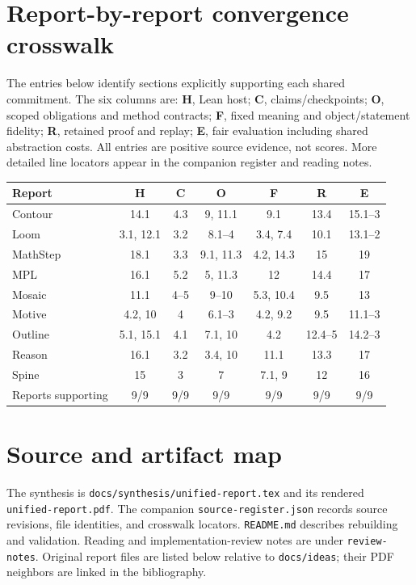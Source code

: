 \documentclass[11pt,letterpaper]{article}
\newcommand{\code}[1]{\nolinkurl{#1}}
\begin{document}
\appendix
\section{Report-by-report convergence crosswalk}\label{app:convergence}
The entries below identify sections explicitly supporting each shared commitment.
The six columns are: \textbf{H}, Lean host; \textbf{C}, claims/checkpoints;
\textbf{O}, scoped obligations and method contracts; \textbf{F}, fixed meaning
and object/statement fidelity; \textbf{R}, retained proof and replay;
\textbf{E}, fair evaluation including shared abstraction costs. All entries are
positive source evidence, not scores. More detailed line locators appear in
the companion register and reading notes.

\begin{center}\small
\begin{tabular}{@{}lcccccc@{}}
\toprule
Report & H & C & O & F & R & E \\
\midrule
Contour & 14.1 & 4.3 & 9, 11.1 & 9.1 & 13.4 & 15.1--3\\
Loom & 3.1, 12.1 & 3.2 & 8.1--4 & 3.4, 7.4 & 10.1 & 13.1--2\\
MathStep & 18.1 & 3.3 & 9.1, 11.3 & 4.2, 14.3 & 15 & 19\\
MPL & 16.1 & 5.2 & 5, 11.3 & 12 & 14.4 & 17\\
Mosaic & 11.1 & 4--5 & 9--10 & 5.3, 10.4 & 9.5 & 13\\
Motive & 4.2, 10 & 4 & 6.1--3 & 4.2, 9.2 & 9.5 & 11.1--3\\
Outline & 5.1, 15.1 & 4.1 & 7.1, 10 & 4.2 & 12.4--5 & 14.2--3\\
Reason & 16.1 & 3.2 & 3.4, 10 & 11.1 & 13.3 & 17\\
Spine & 15 & 3 & 7 & 7.1, 9 & 12 & 16\\
\midrule
Reports supporting & 9/9 & 9/9 & 9/9 & 9/9 & 9/9 & 9/9\\
\bottomrule
\end{tabular}
\end{center}

\section{Source and artifact map}\label{app:sources}
The synthesis is \code{docs/synthesis/unified-report.tex} and its rendered
\code{unified-report.pdf}. The companion \code{source-register.json} records source
revisions, file identities, and crosswalk locators. \code{README.md} describes
rebuilding and validation. Reading and implementation-review notes are under
\code{review-notes}. Original report files are listed below relative to
\code{docs/ideas}; their PDF neighbors are linked in the bibliography.
\end{document}

